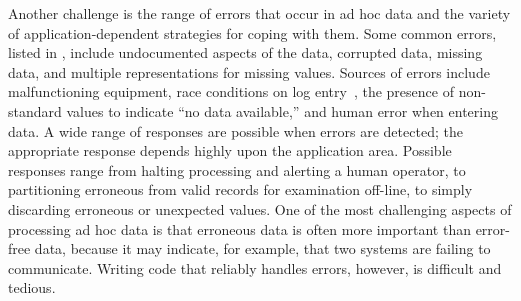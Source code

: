Another challenge is the range of errors that occur in ad hoc data and
the variety of application-dependent strategies for coping with them.
Some common errors, listed in , include
undocumented aspects of the data, corrupted data, missing data, and
multiple representations for missing values.  Sources of errors
include malfunctioning equipment, race conditions on log
entry~\cite{wpp}, the presence of non-standard values to indicate ``no
data available,'' and human error when entering data.  A wide range of
responses are possible when errors are detected; the appropriate
response depends highly upon the application area. Possible responses
range from halting processing and alerting a human operator, to
partitioning erroneous from valid records for examination off-line, to
simply discarding erroneous or unexpected values.  One of the most
challenging aspects of processing ad hoc data is that erroneous data
is often more important than error-free data, because it may indicate,
for example, that two systems are failing to communicate.  Writing
code that reliably handles errors, however, is difficult and tedious.


